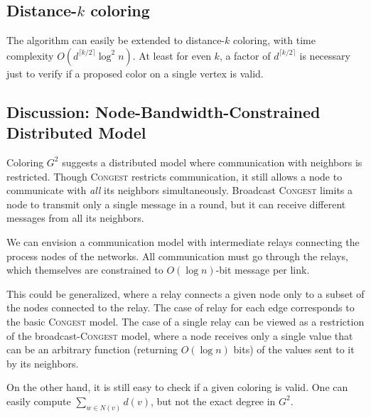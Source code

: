 \documentclass[12pt]{article}
\newcommand{\congest}{\textsc{Congest}}
\begin{document}


\subsection{Distance-$k$ coloring}

The algorithm can easily be extended to distance-$k$ coloring, with time complexity $O(d^{\lceil k/2\rceil} \log^2 n)$. 
At least for even $k$, a factor of $d^{\lceil k/2\rceil}$ is necessary just to verify if a proposed color on a single vertex is valid.



\subsection{Discussion: Node-Bandwidth-Constrained Distributed Model}
\label{sec:cap}

Coloring $G^2$ suggests a distributed model where communication with neighbors is restricted. Though {\congest} restricts communication, it still allows a node to communicate with \emph{all} its neighbors simultaneously.
Broadcast {\congest} limits a node to transmit only a single message in a round, but it can receive different messages from all its neighbors.

% 
We can envision a communication model with intermediate relays connecting the process nodes of the networks. All communication must go through the relays, which themselves are constrained to $O(\log n)$-bit message per link. 

This could be generalized, where a relay connects a given node only to a subset of the nodes connected to the relay.
The case of relay for each edge corresponds to the basic {\congest} model. The case of a single relay can be viewed as a restriction of the broadcast-{\congest} model, where a node receives only a single value that can be an arbitrary function (returning $O(\log n)$ bits) of the values sent to it by its neighbors.

On the other hand, it is still easy to check if a given coloring is valid. One can easily compute $\sum_{w \in N(v)} d(v)$, but not the exact degree in $G^2$. 
\end{document}
